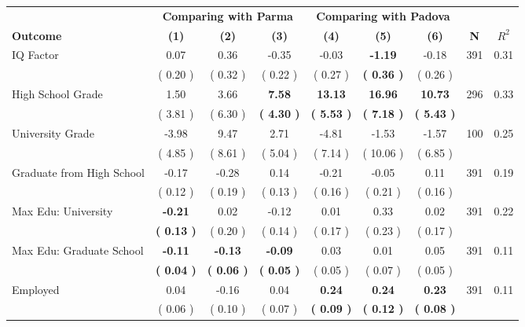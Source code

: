 \begin{tabular}{lcccccccc}
\toprule
 & \multicolumn{3}{c}{\textbf{Comparing with Parma}} & \multicolumn{3}{c}{\textbf{Comparing with Padova}} & \\
\cmidrule(lr){2-4} \cmidrule(lr){5-7} 
 \textbf{Outcome} & \textbf{(1)} & \textbf{(2)} & \textbf{(3)} & \textbf{(4)} & \textbf{(5)} & \textbf{(6)} & \textbf{N} & \textbf{$ R^2$} \\
\midrule
IQ Factor &      0.07 &      0.36 &     -0.35 &     -0.03 & \textbf{    -1.19} &     -0.18 & 391 &       0.31 \\ 
 & (     0.20 ) & (     0.32 ) & (     0.22 ) & (     0.27 ) & \textbf{(     0.36 )} & (     0.26 ) & \\
High School Grade &      1.50 &      3.66 & \textbf{     7.58} & \textbf{    13.13} & \textbf{    16.96} & \textbf{    10.73} & 296 &       0.33 \\ 
 & (     3.81 ) & (     6.30 ) & \textbf{(     4.30 )} & \textbf{(     5.53 )} & \textbf{(     7.18 )} & \textbf{(     5.43 )} & \\
University Grade &     -3.98 &      9.47 &      2.71 &     -4.81 &     -1.53 &     -1.57 & 100 &       0.25 \\ 
 & (     4.85 ) & (     8.61 ) & (     5.04 ) & (     7.14 ) & (    10.06 ) & (     6.85 ) & \\
Graduate from High School &     -0.17 &     -0.28 &      0.14 &     -0.21 &     -0.05 &      0.11 & 391 &       0.19 \\ 
 & (     0.12 ) & (     0.19 ) & (     0.13 ) & (     0.16 ) & (     0.21 ) & (     0.16 ) & \\
Max Edu: University & \textbf{    -0.21} &      0.02 &     -0.12 &      0.01 &      0.33 &      0.02 & 391 &       0.22 \\ 
 & \textbf{(     0.13 )} & (     0.20 ) & (     0.14 ) & (     0.17 ) & (     0.23 ) & (     0.17 ) & \\
Max Edu: Graduate School & \textbf{    -0.11} & \textbf{    -0.13} & \textbf{    -0.09} &      0.03 &      0.01 &      0.05 & 391 &       0.11 \\ 
 & \textbf{(     0.04 )} & \textbf{(     0.06 )} & \textbf{(     0.05 )} & (     0.05 ) & (     0.07 ) & (     0.05 ) & \\
Employed &      0.04 &     -0.16 &      0.04 & \textbf{     0.24} & \textbf{     0.24} & \textbf{     0.23} & 391 &       0.11 \\ 
 & (     0.06 ) & (     0.10 ) & (     0.07 ) & \textbf{(     0.09 )} & \textbf{(     0.12 )} & \textbf{(     0.08 )} & \\

\end{tabular}
